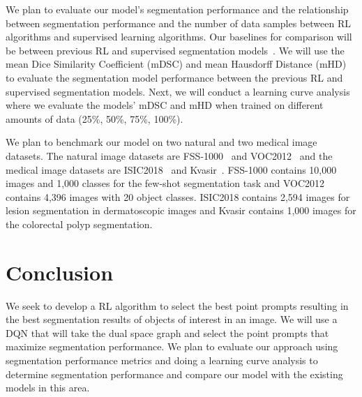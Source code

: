 \documentclass[conference]{IEEEtran}
\begin{document}
We plan to evaluate our model's segmentation performance and the relationship between segmentation performance and the number of data samples between RL algorithms and supervised learning algorithms. Our baselines for comparison will be between previous RL and supervised segmentation models~\cite{Huang2024AlignSAM, Liu2025PPO, Liu2023Matcher, Sun2024VRPSAM, Xiong2024SAM2UNet, Zhang2023PerSAM}. We will use the mean Dice Similarity Coefficient (mDSC) and mean Hausdorff Distance (mHD) to evaluate the segmentation model performance between the previous RL and supervised segmentation models. Next, we will conduct a learning curve analysis where we evaluate the models' mDSC and mHD when trained on different amounts of data (25\%, 50\%, 75\%, 100\%).

We plan to benchmark our model on two natural and two medical image datasets. The natural image datasets are FSS-1000~\cite{Li2020FSS1000} and VOC2012~\cite{Shetty2016PascalVOC} and the medical image datasets are ISIC2018~\cite{Codella2019ISIC} and Kvasir~\cite{Jha2020KvasirSEG}. FSS-1000 contains 10,000 images and 1,000 classes for the few-shot segmentation task and VOC2012 contains 4,396 images with 20 object classes. ISIC2018 contains 2,594 images for lesion segmentation in dermatoscopic images and Kvasir contains 1,000 images for the colorectal polyp segmentation.

\section{Conclusion}

We seek to develop a RL algorithm to select the best point prompts resulting in the best segmentation results of objects of interest in an image. We will use a DQN that will take the dual space graph and select the point prompts that maximize segmentation performance. We plan to evaluate our approach using segmentation performance metrics and doing a learning curve analysis to determine segmentation performance and compare our model with the existing models in this area.



\end{document}
